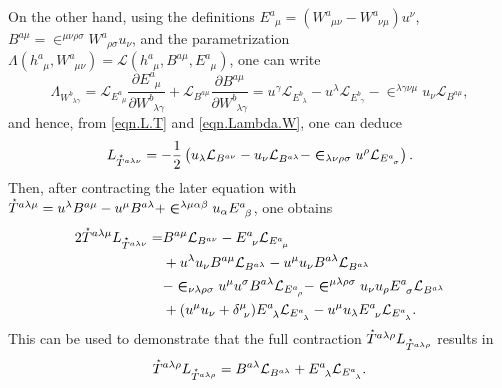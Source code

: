 \documentclass[
10pt, %
a4paper, %
oneside, %
headinclude,footinclude, %
BCOR5mm, %
]{scrartcl}
\newcommand{\tetrsymbol}{h}
\newcommand{\tetr}[2]{\tetrsymbol^{#1}_{\phantom{#1}#2}}
\newcommand{\ET}[2]{E^{#1}_{\phantom{#1}#2}}	%
\newcommand{\BT}[2]{B^{#1#2}}	%
\newcommand{\w}[2]{W^{#1}_{\phantom{#1}#2}}
\newcommand{\Lag}{\Lambda}	%
\newcommand{\Laghodge}{L}%
\newcommand{\LagBE}{\mathcal{L}}%
\newcommand{\LCsymb}{\bm{\in}}    %
\newcommand{\HDT}[1]{\accentset{\star}{T}^{#1}}
\newcommand{\KD}[2]{\delta^{#1}_{\ #2}}
\begin{document}
On the other hand, using the definitions $ \ET{a}{\mu} = (\w{a}{\mu\nu} - \w{a}{\nu\mu})u^\nu $, $ 
\BT{a}{\mu} = \LCsymb^{\mu\nu\rho\sigma}\w{a}{\rho\sigma} u_\nu $, and  the parametrization $ 
\Lag(\tetr{a}{\mu},\w{a}{\mu\nu}) = \LagBE(\tetr{a}{\mu},\BT{a}{\mu},\ET{a}{\mu}) $, one can write
\begin{equation}\label{eqn.Lambda.W}
	\Lag_{\w{b}{\lambda\gamma}} = 
	\LagBE_{\ET{a}{\mu}} \frac{\partial \ET{a}{\mu}}{\partial \w{b}{\lambda\gamma}} 
	+
	\LagBE_{\BT{a}{\mu}} \frac{\partial \BT{a}{\mu}}{\partial \w{b}{\lambda\gamma}} 
	=
	u^\gamma \LagBE_{\ET{b}{\lambda}} - u^\lambda \LagBE_{\ET{b}{\gamma}} - 
	\LCsymb^{\lambda\gamma\nu\mu} u_\nu \LagBE_{\BT{a}{\mu}},
\end{equation}
and hence, from \eqref{eqn.L.T} and \eqref{eqn.Lambda.W}, one can deduce 
\begin{equation}
	\Laghodge_{\HDT{a\lambda\nu}} = -\frac{1}{2} 
	\left(
	u_\lambda \LagBE_{\BT{a}{\nu}} - u_\nu \LagBE_{\BT{a}{\lambda}} 
	-
	\LCsymb_{\lambda\nu\rho\sigma} u^\rho \LagBE_{\ET{a}{\sigma}} 
	\right).
\end{equation}
Then, after contracting the later equation with $ \HDT{a\lambda\mu} = u^\lambda \BT{a}{\mu} - u^\mu 
\BT{a}{\lambda} + \LCsymb^{\lambda\mu\alpha\beta} u_\alpha \ET{a}{\beta} $, one obtains
 \begin{align}\label{eqn.T.L.T} 
 	2 \HDT{a\lambda\mu} \Laghodge_{\HDT{a\lambda\nu}} =
 	&  \BT{a}{\mu}\LagBE_{\BT{a}{\nu}} 
 	 - \ET{a}{\nu}\LagBE_{\ET{a}{\mu}} \\
 	& + u^\lambda u_\nu \BT{a}{\mu} \LagBE_{\BT{a}{\lambda}} - u^\mu u_\nu \BT{a}{\lambda} 
 	\LagBE_{\BT{a}{\lambda}}				\nonumber\\
 	& - \LCsymb_{\nu\lambda\rho\sigma} u^\mu u^\sigma \BT{a}{\lambda} \LagBE_{\ET{a}{\rho}} 
 	  - \LCsymb^{\mu\lambda\rho\sigma} u_\nu u_\rho \ET{a}{\sigma} \LagBE_{\BT{a}{\lambda}}
 	\nonumber \\
 	& + (u^\mu u_\nu + \KD{\mu}{\nu}) \ET{a}{\lambda} \LagBE_{\ET{a}{\lambda}} - u^\mu u_\lambda 
 	\ET{a}{\nu} \LagBE_{\ET{a}{\lambda}}.
 	\nonumber
 \end{align}
This can be used to demonstrate that the full contraction  $ 	\HDT{a\lambda\rho} 
\Laghodge_{\HDT{a\lambda\rho}} $ results in
\begin{equation}\label{eqn.T.L.T.full}
	\HDT{a\lambda\rho} \Laghodge_{\HDT{a\lambda\rho}}
	=
	\BT{a}{\lambda} \LagBE_{\BT{a}{\lambda}} + \ET{a}{\lambda} \LagBE_{\ET{a}{\lambda}}.
\end{equation}
\end{document}
